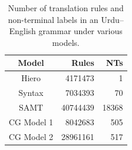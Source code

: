 \documentclass[a4paper]{article}
\begin{document}
\begin{table}
\centering
\begin{tabular}{|c|r|r|}
\hline
Model & Rules & NTs\\
\hline
Hiero & 4171473 & 1\\
Syntax & 7034393 & 70\\
SAMT & 40744439 & 18368\\
CG Model 1 & 8042683 & 505\\
CG Model 2 & 28961161 & 517\\
\hline
\end{tabular}
\caption{Number of translation rules and non-terminal labels in an Urdu--English grammar under various models.\label{table:rule-count}}
\end{table}

\end{document}

